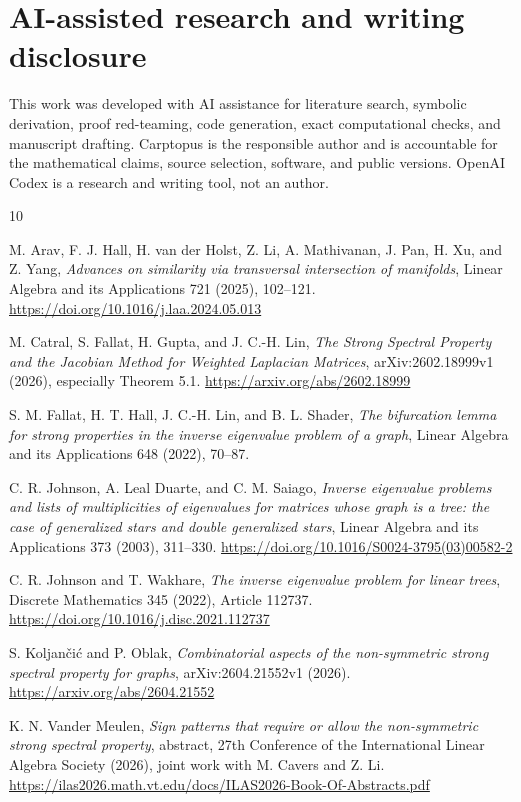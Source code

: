 \documentclass[11pt]{article}
\theoremstyle{remark}
\begin{document}
\section{AI-assisted research and writing disclosure}

This work was developed with AI assistance for literature search, symbolic derivation, proof red-teaming, code generation, exact computational checks, and manuscript drafting. Carptopus is the responsible author and is accountable for the mathematical claims, source selection, software, and public versions. OpenAI Codex is a research and writing tool, not an author.

\begin{thebibliography}{10}

 M. Arav, F. J. Hall, H. van der Holst, Z. Li, A. Mathivanan, J. Pan, H. Xu, and Z. Yang, \emph{Advances on similarity via transversal intersection of manifolds}, Linear Algebra and its Applications 721 (2025), 102--121. \url{https://doi.org/10.1016/j.laa.2024.05.013}

 M. Catral, S. Fallat, H. Gupta, and J. C.-H. Lin, \emph{The Strong Spectral Property and the Jacobian Method for Weighted Laplacian Matrices}, arXiv:2602.18999v1 (2026), especially Theorem 5.1. \url{https://arxiv.org/abs/2602.18999}

 S. M. Fallat, H. T. Hall, J. C.-H. Lin, and B. L. Shader, \emph{The bifurcation lemma for strong properties in the inverse eigenvalue problem of a graph}, Linear Algebra and its Applications 648 (2022), 70--87.

 C. R. Johnson, A. Leal Duarte, and C. M. Saiago, \emph{Inverse eigenvalue problems and lists of multiplicities of eigenvalues for matrices whose graph is a tree: the case of generalized stars and double generalized stars}, Linear Algebra and its Applications 373 (2003), 311--330. \url{https://doi.org/10.1016/S0024-3795(03)00582-2}

 C. R. Johnson and T. Wakhare, \emph{The inverse eigenvalue problem for linear trees}, Discrete Mathematics 345 (2022), Article 112737. \url{https://doi.org/10.1016/j.disc.2021.112737}

 S. Koljan\v{c}i\'{c} and P. Oblak, \emph{Combinatorial aspects of the non-symmetric strong spectral property for graphs}, arXiv:2604.21552v1 (2026). \url{https://arxiv.org/abs/2604.21552}

 K. N. Vander Meulen, \emph{Sign patterns that require or allow the non-symmetric strong spectral property}, abstract, 27th Conference of the International Linear Algebra Society (2026), joint work with M. Cavers and Z. Li. \url{https://ilas2026.math.vt.edu/docs/ILAS2026-Book-Of-Abstracts.pdf}


\end{thebibliography}
\end{document}
